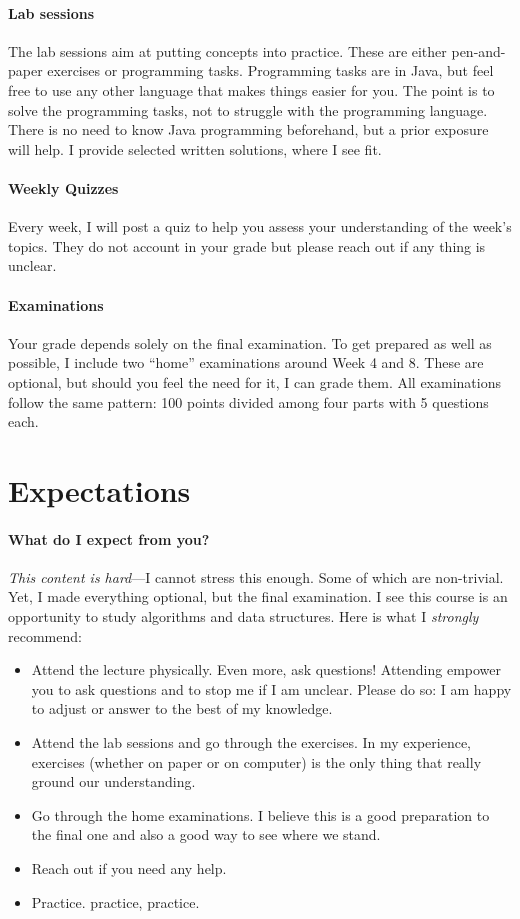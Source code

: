 \documentclass{aldast}
\begin{document}
\paragraph {Lab sessions}
The lab sessions aim at putting concepts into practice. These are
either pen-and-paper exercises or programming tasks. Programming tasks
are in Java, but feel free to use any other language that makes things
easier for you. The point is to solve the programming tasks, not to
struggle with the programming language. There is no need to
know Java programming beforehand, but a prior exposure will help. I
provide selected written solutions, where I see fit.

\paragraph {Weekly Quizzes}
Every week, I will post a quiz to help you assess your understanding
of the week's topics. They do not account in your grade but please
reach out if any thing is unclear.

\paragraph{Examinations}
Your grade depends solely on the final examination. To get prepared as
well as possible, I include two ``home'' examinations around Week 4 and
8. These are optional, but should you feel the need for it, I can
grade them. All examinations follow the same pattern: 100 points
divided among four parts with 5 questions each.

\section{Expectations}

\paragraph{What do I expect from you?}

\emph{This content is hard}---I cannot stress this enough. Some of
which are non-trivial. Yet, I made everything optional, but the final
examination. I see this course is an opportunity to study algorithms
and data structures. Here is what I \emph{strongly} recommend:

\begin{itemize}
\item Attend the lecture physically. Even more, ask questions!
  Attending empower you to ask questions and to stop me if I am
  unclear. Please do so: I am happy to adjust or answer to the best of
  my knowledge.
\item Attend the lab sessions and go through the exercises. In my
  experience, exercises (whether on paper or on computer) is the only
  thing that really ground our understanding.
\item Go through the home examinations. I believe this is a good
  preparation to the final one and also a good way to see where we
  stand.
\item Reach out if you need any help.
\item Practice. practice, practice.
\end{itemize}
\end{document}
